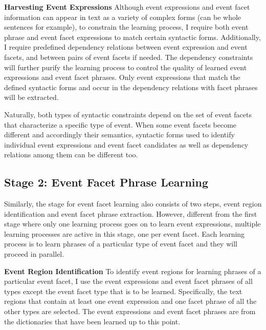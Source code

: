 \vspace{.1in}
\textbf{Harvesting Event Expressions}
\vspace{.1in}
Although event expressions and event facet information 
can appear in text as a variety of complex forms 
(can be whole sentences for example), 
to constrain the learning process, I require 
both event phrase and event facet expressions to match
certain syntactic forms. 
Additionally, I require predefined dependency relations 
between event expression and event facets, and between 
pairs of event facets if needed.
The dependency constraints will further purify 
the learning process to 
control the quality of 
learned event expressions and event facet phrases. 
Only event expressions that match the defined 
syntactic forms and 
occur in the dependency relations with 
facet phrases will be extracted. 

Naturally, both types of syntactic constraints 
depend on the set of event facets that 
characterize a specific type of event. 
When some event facets become different and accordingly their semantics, 
syntactic forms used to identify 
individual event expressions 
and event facet candidates 
as well as dependency relations 
among them can be different too. 


\subsection{Stage 2: Event Facet Phrase Learning}
Similarly, the stage for event facet learning also consists of 
two steps, event region identification and event facet phrase extraction. 
However, different from the first stage where only one learning process 
goes on to learn event expressions, multiple learning processes 
are active in this stage, one per event facet. 
Each learning process is to learn phrases of a particular type of event facet 
and they will proceed in parallel.

\vspace{.1in}
\textbf{Event Region Identification}
\vspace{.1in}
To identify event regions for learning phrases of a particular event facet,
I use the event expressions and event facet phrases 
of all types except the event facet type that is to be learned. 
Specifically, the text regions that contain at least one event expression 
and one facet phrase of all the other types are selected. 
The event expressions and event facet phrases are from the dictionaries 
that have been learned 
up to this point.  

